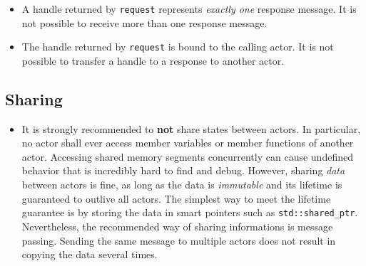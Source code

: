 \begin{itemize}

\item
A handle returned by \lstinline^request^ represents \emph{exactly one} response message.
It is not possible to receive more than one response message.

\item
The handle returned by \lstinline^request^ is bound to the calling actor.
It is not possible to transfer a handle to a response to another actor.

\end{itemize}

\clearpage
\subsection{Sharing}

\begin{itemize}
\item It is strongly recommended to \textbf{not} share states between actors.
In particular, no actor shall ever access member variables or member functions of another actor.
Accessing shared memory segments concurrently can cause undefined behavior that is incredibly hard to find and debug.
However, sharing \textit{data} between actors is fine, as long as the data is \textit{immutable} and its lifetime is guaranteed to outlive all actors.
The simplest way to meet the lifetime guarantee is by storing the data in smart pointers such as \lstinline^std::shared_ptr^.
Nevertheless, the recommended way of sharing informations is message passing.
Sending the same message to multiple actors does not result in copying the data several times.
\end{itemize}
